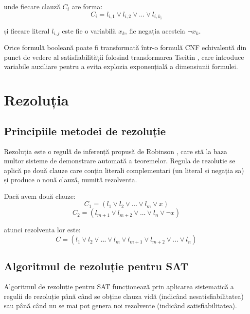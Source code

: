 \documentclass[a4paper,10pt]{article}
\begin{document}
unde fiecare clauză $C_i$ are forma:
\begin{equation}
C_i = l_{i,1} \lor l_{i,2} \lor \ldots \lor l_{i,k_i}
\end{equation}

și fiecare literal $l_{i,j}$ este fie o variabilă $x_k$, fie negația acesteia $\neg x_k$.

Orice formulă booleană poate fi transformată într-o formulă CNF echivalentă din punct de vedere al satisfiabilității folosind transformarea Tseitin \cite{Tseitin1983}, care introduce variabile auxiliare pentru a evita explozia exponențială a dimensiunii formulei.

\section{Rezoluția}

\subsection{Principiile metodei de rezoluție}

Rezoluția este o regulă de inferență propusă de Robinson \cite{Robinson1965}, care stă la baza multor sisteme de demonstrare automată a teoremelor. Regula de rezoluție se aplică pe două clauze care conțin literali complementari (un literal și negația sa) și produce o nouă clauză, numită rezolventa.

Dacă avem două clauze:
\begin{equation}
C_1 = (l_1 \lor l_2 \lor \ldots \lor l_m \lor x)
\end{equation}
\begin{equation}
C_2 = (l_{m+1} \lor l_{m+2} \lor \ldots \lor l_n \lor \neg x)
\end{equation}

atunci rezolventa lor este:
\begin{equation}
C = (l_1 \lor l_2 \lor \ldots \lor l_m \lor l_{m+1} \lor l_{m+2} \lor \ldots \lor l_n)
\end{equation}

\subsection{Algoritmul de rezoluție pentru SAT}

Algoritmul de rezoluție pentru SAT funcționează prin aplicarea sistematică a regulii de rezoluție până când se obține clauza vidă (indicând nesatisfiabilitatea) sau până când nu se mai pot genera noi rezolvente (indicând satisfiabilitatea).
\end{document}
